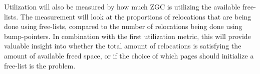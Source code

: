 Utilization will also be measured by how much ZGC is utilizing the available free-lists. The measurement will look at the proportions of relocations that are being done using free-lists, compared to the number of relocations being done using bump-pointers. In combination with the first utilization metric, this will provide valuable insight into whether the total amount of relocations is satisfying the amount of available freed space, or if the choice of which pages should initialize a free-list is the problem. 

